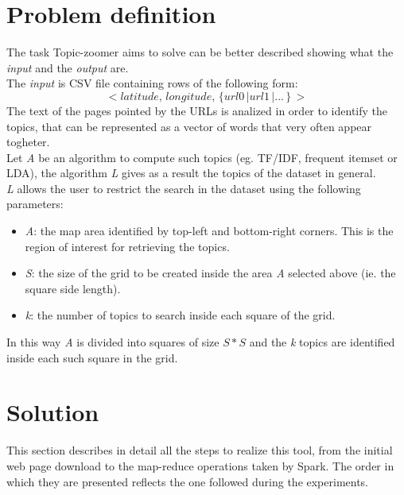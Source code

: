 \documentclass{sig-alternate-05-2015}
\begin{document}
\section{Problem definition}
The task Topic-zoomer aims to solve can be better described showing what the \emph{input} and the \emph{output} are.\\
The \emph{input} is CSV file containing rows of the following form:
\begin{equation}\label{dataset}
    <latitude,\,longitude,\,\{url0\,|url1\,|...\,\}\,>
\end{equation}
The text of the pages pointed by the URLs is analized in order to identify the topics, that can be represented as a vector of words that very often appear togheter.\\
Let \emph{A} be an algorithm to compute such topics (eg. TF/IDF, frequent itemset or LDA), the algorithm \emph{L} gives as a result the topics of the dataset in general.\\
\emph{L} allows the user to restrict the search in the dataset using the following parameters:
\begin{itemize}
    \item \emph{A}: the map area identified by top-left and bottom-right corners. This is the region of interest for retrieving the topics. 
    \item \emph{S}: the size of the grid to be created inside the area \emph{A} selected above (ie. the square side length).
    \item \emph{k}: the number of topics to search inside each square of the grid.
\end{itemize}
In this way \emph{A} is divided into squares of size $S*S$ and the \emph{k} topics are identified inside each such square in the grid.


\section{Solution}
This section describes in detail all the steps to realize this tool, from the initial web page download to the map-reduce operations taken by Spark. The order in which they are presented reflects the one followed during the experiments.
\end{document}
